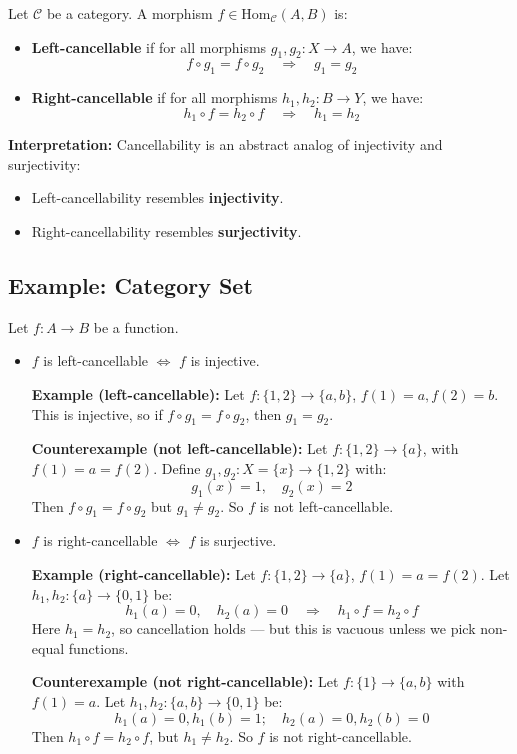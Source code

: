 \documentclass[10pt]{article}
\theoremstyle{plain}
\theoremstyle{definition}
\begin{document}
Let \( \mathcal{C} \) be a category. A morphism \( f \in \text{Hom}_\mathcal{C}(A, B) \) is:

\begin{itemize}
	\item \textbf{Left-cancellable} if for all morphisms \( g_1, g_2 : X \to A \), we have:
	\[
	f \circ g_1 = f \circ g_2 \quad \Rightarrow \quad g_1 = g_2
	\]
	
	\item \textbf{Right-cancellable} if for all morphisms \( h_1, h_2 : B \to Y \), we have:
	\[
	h_1 \circ f = h_2 \circ f \quad \Rightarrow \quad h_1 = h_2
	\]
\end{itemize}

\textbf{Interpretation:}  
Cancellability is an abstract analog of injectivity and surjectivity:
\begin{itemize}
	\item Left-cancellability resembles \textbf{injectivity}.
	\item Right-cancellability resembles \textbf{surjectivity}.
\end{itemize}

\subsection*{Example: Category \textbf{Set}}

Let \( f: A \to B \) be a function.

\begin{itemize}
	\item \( f \) is left-cancellable \( \Leftrightarrow \) \( f \) is injective.
	
	\textbf{Example (left-cancellable):}  
	Let \( f: \{1,2\} \to \{a,b\} \), \( f(1) = a, f(2) = b \).  
	This is injective, so if \( f \circ g_1 = f \circ g_2 \), then \( g_1 = g_2 \).
	
	\textbf{Counterexample (not left-cancellable):}  
	Let \( f: \{1,2\} \to \{a\} \), with \( f(1) = a = f(2) \).  
	Define \( g_1, g_2: X = \{x\} \to \{1,2\} \) with:
	\[
	g_1(x) = 1,\quad g_2(x) = 2
	\]
	Then \( f \circ g_1 = f \circ g_2 \) but \( g_1 \neq g_2 \). So \( f \) is not left-cancellable.
	
	\item \( f \) is right-cancellable \( \Leftrightarrow \) \( f \) is surjective.
	
	\textbf{Example (right-cancellable):}  
	Let \( f: \{1,2\} \to \{a\} \), \( f(1) = a = f(2) \).  
	Let \( h_1, h_2: \{a\} \to \{0,1\} \) be:
	\[
	h_1(a) = 0, \quad h_2(a) = 0 \quad \Rightarrow \quad h_1 \circ f = h_2 \circ f
	\]
	Here \( h_1 = h_2 \), so cancellation holds — but this is vacuous unless we pick non-equal functions.
	
	\textbf{Counterexample (not right-cancellable):}  
	Let \( f: \{1\} \to \{a,b\} \) with \( f(1) = a \).  
	Let \( h_1, h_2: \{a,b\} \to \{0,1\} \) be:
	\[
	h_1(a) = 0, h_1(b) = 1; \quad h_2(a) = 0, h_2(b) = 0
	\]
	Then \( h_1 \circ f = h_2 \circ f \), but \( h_1 \neq h_2 \). So \( f \) is not right-cancellable.
\end{itemize}
\end{document}
